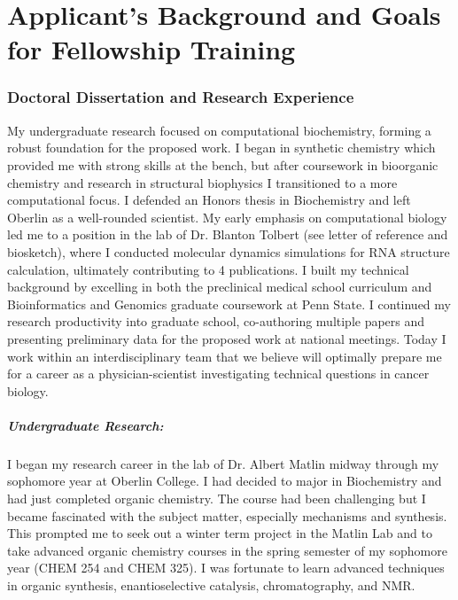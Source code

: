 \documentclass{NIHGrant}
\begin{document}
\part*{Applicant's Background and Goals for Fellowship Training}
\section*{Doctoral Dissertation and Research Experience}
My undergraduate research focused on computational biochemistry, forming a robust foundation for the proposed work. I began in synthetic chemistry which provided me with strong skills at the bench, but after coursework in bioorganic chemistry and research in structural biophysics I transitioned to a more computational focus. I defended an Honors thesis in Biochemistry and left Oberlin as a well-rounded scientist. My early emphasis on computational biology led me to a position in the lab of Dr. Blanton Tolbert (see letter of reference and biosketch), where I conducted molecular dynamics simulations for RNA structure calculation, ultimately contributing to 4 publications. I built my technical background by excelling in both the preclinical medical school curriculum and Bioinformatics and Genomics graduate coursework at Penn State. I continued my research productivity into graduate school, co-authoring multiple papers and presenting preliminary data for the proposed work at national meetings. Today I work within an interdisciplinary team that we believe will optimally prepare me for a career as a physician-scientist investigating technical questions in cancer biology.

\subsubsection*{Undergraduate Research:}
I began my research career in the lab of Dr. Albert Matlin midway through my sophomore year at Oberlin College. I had decided to major in Biochemistry and had just completed organic chemistry. The course had been challenging but I became fascinated with the subject matter, especially mechanisms and synthesis. This prompted me to seek out a winter term project in the Matlin Lab and to take advanced organic chemistry courses in the spring semester of my sophomore year (CHEM 254 and CHEM 325). I was fortunate to learn advanced techniques in organic synthesis, enantioselective catalysis, chromatography, and NMR.
\end{document}
